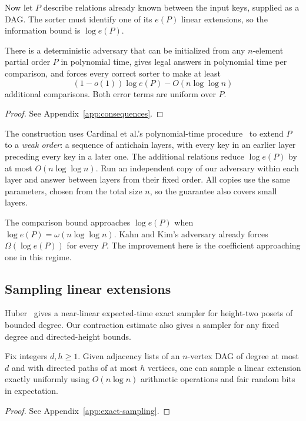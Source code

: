 Now let $P$ describe relations already known between the input keys,
supplied as a DAG. The sorter must identify one of its $e(P)$ linear
extensions, so the information bound is $\log e(P)$.

\begin{corollary}\label{cor:initial-poset}
There is a deterministic adversary that can be initialized from any
$n$-element partial order $P$ in polynomial time, gives legal answers in
polynomial time per comparison, and forces every correct sorter to make
at least
\[
(1-o(1))\log e(P)-O(n\log\log n)
\]
additional comparisons. Both error terms are uniform over $P$.
\end{corollary}
\begin{proof}
See Appendix~\ref{app:consequences}.
\end{proof}

The construction uses Cardinal et al.'s polynomial-time procedure~\cite{cardinal-production} to
extend $P$ to a \emph{weak order}: a sequence of antichain layers, with
every key in an earlier layer preceding every key in a later one.
The additional relations reduce $\log e(P)$ by at most
$O(n\log\log n)$.
Run an independent copy of our adversary within each layer and answer
between layers from their fixed order. All copies use the same parameters,
chosen from the total size $n$, so the guarantee also covers small layers.

The comparison bound approaches $\log e(P)$ when
$\log e(P)=\omega(n\log\log n)$. Kahn and Kim's adversary already forces
$\Omega(\log e(P))$ for every $P$. The improvement here is the
coefficient approaching one in this regime.

\subsection{Sampling linear extensions}

Huber~\cite{huber-sampling} gives a near-linear expected-time exact
sampler for height-two posets of bounded degree. Our contraction
estimate also gives a sampler for any fixed degree and directed-height
bounds.

\begin{corollary}\label{cor:exact-sampling}
Fix integers $d,h\ge1$. Given adjacency lists of an $n$-vertex DAG of
degree at most $d$ and with directed paths of at most $h$ vertices, one
can sample a linear extension exactly uniformly using
$O(n\log n)$ arithmetic operations and fair random bits in
expectation.
\end{corollary}
\begin{proof}
See Appendix~\ref{app:exact-sampling}.
\end{proof}

